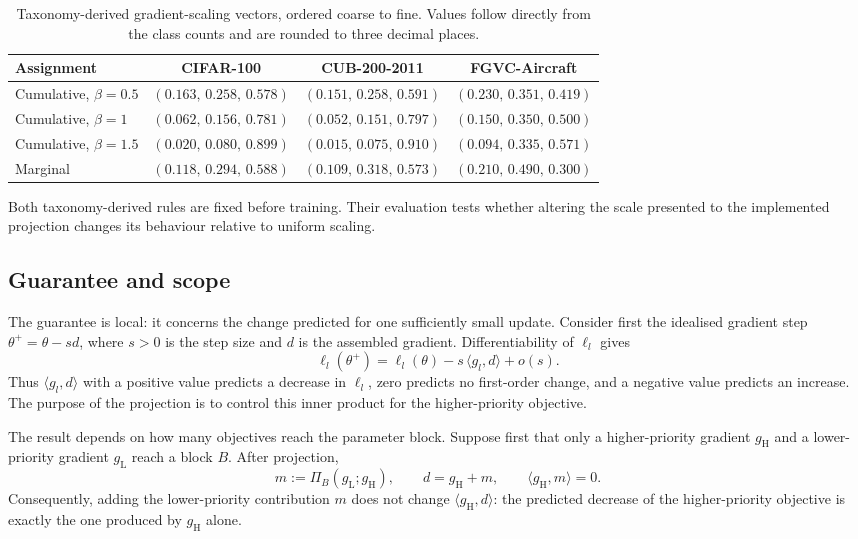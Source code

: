 \begin{table}[htbp]
\centering
\caption{Taxonomy-derived gradient-scaling vectors, ordered coarse to fine.
Values follow directly from the class counts and are rounded to three decimal
places.}
\label{tab:kappa_branching}
\small
\setlength{\tabcolsep}{4pt}
\begin{tabular}{@{}lccc@{}}
\toprule
\textbf{Assignment} & \textbf{CIFAR-100} & \textbf{CUB-200-2011} &
\textbf{FGVC-Aircraft} \\
\midrule
Cumulative, $\beta=0.5$ & $(0.163,\,0.258,\,0.578)$ & $(0.151,\,0.258,\,0.591)$ & $(0.230,\,0.351,\,0.419)$ \\
Cumulative, $\beta=1$   & $(0.062,\,0.156,\,0.781)$ & $(0.052,\,0.151,\,0.797)$ & $(0.150,\,0.350,\,0.500)$ \\
Cumulative, $\beta=1.5$ & $(0.020,\,0.080,\,0.899)$ & $(0.015,\,0.075,\,0.910)$ & $(0.094,\,0.335,\,0.571)$ \\
Marginal                  & $(0.118,\,0.294,\,0.588)$ & $(0.109,\,0.318,\,0.573)$ & $(0.210,\,0.490,\,0.300)$ \\
\bottomrule
\end{tabular}
\end{table}

Both taxonomy-derived rules are fixed before training. Their evaluation tests
whether altering the scale presented to the implemented projection changes its
behaviour relative to uniform scaling.

\subsection{Guarantee and scope}
\label{ssec:lex_guarantee}

The guarantee is local: it concerns the change predicted for one sufficiently
small update. Consider first the idealised gradient step
$\theta^+=\theta-sd$, where $s>0$ is the step size and $d$ is the assembled gradient. Differentiability
of $\ell_l$ gives
\[
\ell_l(\theta^+)
=\ell_l(\theta)-s\,\langle g_l,d\rangle+o(s).
\]
Thus $\langle g_l,d\rangle$ with a positive value predicts a decrease in $\ell_l$, zero predicts no first-order
change, and a negative value predicts an increase. The purpose of the projection
is to control this inner product for the higher-priority objective.

The result depends on how many objectives reach the parameter block. Suppose
first that only a higher-priority gradient $g_{\mathrm{H}}$ and a lower-priority
gradient $g_{\mathrm{L}}$ reach a block $B$. After projection,
\[
m:=\Pi_B(g_{\mathrm{L}};g_{\mathrm{H}}),
\qquad
d=g_{\mathrm{H}}+m,
\qquad
\langle g_{\mathrm{H}},m\rangle=0.
\]
Consequently, adding the lower-priority contribution $m$ does not change
$\langle g_{\mathrm{H}},d\rangle$: the predicted decrease of the
higher-priority objective is exactly the one produced by $g_{\mathrm{H}}$ alone.

